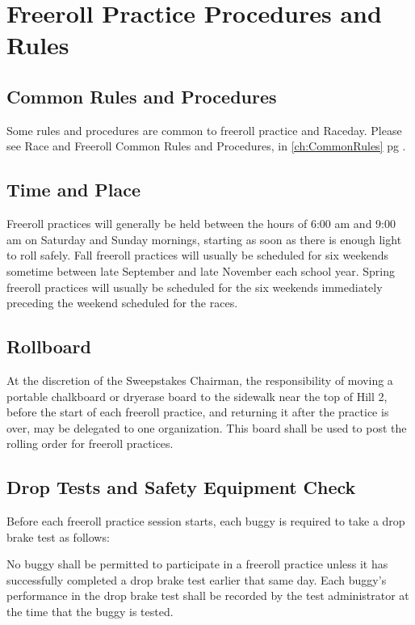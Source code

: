 \section{Freeroll Practice Procedures and Rules}
\label{sec:FreerollRules}

\subsection{Common Rules and Procedures}
	Some rules and procedures are common to freeroll practice and Raceday. Please see Race and Freeroll Common Rules and Procedures, in \ref{ch:CommonRules} pg \pageref{ch:CommonRules}.

\subsection{Time and Place}

	Freeroll practices will generally be held between the hours of 6:00 am and 9:00 am on Saturday and Sunday mornings, starting as soon as there is enough light to roll safely. Fall freeroll practices will usually be scheduled for six weekends sometime between late September and late November each school year. Spring freeroll practices will usually be scheduled for the six weekends immediately preceding the weekend scheduled for the races.

\subsection{Rollboard}

	At the discretion of the Sweepstakes Chairman, the responsibility of moving a portable chalkboard or dryerase board to the sidewalk near the top of Hill 2, before the start of each freeroll practice, and returning it after the practice is over, may be delegated to one organization. This board shall be used to post the rolling order for freeroll practices.

\subsection{Drop Tests and Safety Equipment Check}

	Before each freeroll practice session starts, each buggy is required to take a drop brake test as follows: 
	
	No buggy shall be permitted to participate in a freeroll practice unless it has successfully completed a drop brake test earlier that same day. Each buggy's performance in the drop brake test shall be recorded by the test administrator at the time that the buggy is tested.

